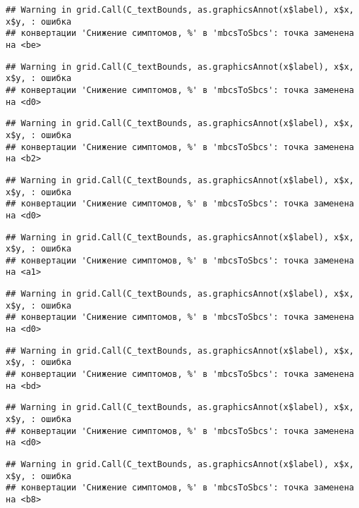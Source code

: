 \documentclass[
]{article}
\begin{document}
\begin{verbatim}
## Warning in grid.Call(C_textBounds, as.graphicsAnnot(x$label), x$x, x$y, : ошибка
## конвертации 'Снижение симптомов, %' в 'mbcsToSbcs': точка заменена на <be>
\end{verbatim}

\begin{verbatim}
## Warning in grid.Call(C_textBounds, as.graphicsAnnot(x$label), x$x, x$y, : ошибка
## конвертации 'Снижение симптомов, %' в 'mbcsToSbcs': точка заменена на <d0>
\end{verbatim}

\begin{verbatim}
## Warning in grid.Call(C_textBounds, as.graphicsAnnot(x$label), x$x, x$y, : ошибка
## конвертации 'Снижение симптомов, %' в 'mbcsToSbcs': точка заменена на <b2>
\end{verbatim}

\begin{verbatim}
## Warning in grid.Call(C_textBounds, as.graphicsAnnot(x$label), x$x, x$y, : ошибка
## конвертации 'Снижение симптомов, %' в 'mbcsToSbcs': точка заменена на <d0>
\end{verbatim}

\begin{verbatim}
## Warning in grid.Call(C_textBounds, as.graphicsAnnot(x$label), x$x, x$y, : ошибка
## конвертации 'Снижение симптомов, %' в 'mbcsToSbcs': точка заменена на <a1>
\end{verbatim}

\begin{verbatim}
## Warning in grid.Call(C_textBounds, as.graphicsAnnot(x$label), x$x, x$y, : ошибка
## конвертации 'Снижение симптомов, %' в 'mbcsToSbcs': точка заменена на <d0>
\end{verbatim}

\begin{verbatim}
## Warning in grid.Call(C_textBounds, as.graphicsAnnot(x$label), x$x, x$y, : ошибка
## конвертации 'Снижение симптомов, %' в 'mbcsToSbcs': точка заменена на <bd>
\end{verbatim}

\begin{verbatim}
## Warning in grid.Call(C_textBounds, as.graphicsAnnot(x$label), x$x, x$y, : ошибка
## конвертации 'Снижение симптомов, %' в 'mbcsToSbcs': точка заменена на <d0>
\end{verbatim}

\begin{verbatim}
## Warning in grid.Call(C_textBounds, as.graphicsAnnot(x$label), x$x, x$y, : ошибка
## конвертации 'Снижение симптомов, %' в 'mbcsToSbcs': точка заменена на <b8>
\end{verbatim}
\end{document}
